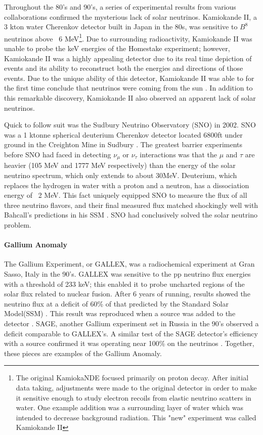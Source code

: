 \documentclass[12pt]{article}
\begin{document}
\par Throughout the 80's and 90's, a series of experimental results from various collaborations confirmed the mysterious lack of solar neutrinos. Kamiokande II, a 3 kton water Cherenkov detector built in Japan in the 80s, was sensitive to $B^8$ neutrinos above ~6 MeV\footnote{The original KamiokaNDE focused primarily on proton decay. After initial data taking, adjustments were made to the original detector in order to make it sensitive enough to study electron recoils from elastic neutrino scatters in water. One example addition was a surrounding layer of water which was intended to decrease background radiation.  This "new" experiment was called Kamiokande II}. Due to surrounding radioactivity, Kamiokande II was unable to probe the keV energies of the Homestake experiment; however, Kamiokande II was a highly appealing detector due to its real time depiction of events and its ability to reconstruct both the energies and directions of those events. Due to the unique ability of this detector, Kamiokande II was able to for the first time conclude that neutrinos were coming from the sun \cite{kam0}.  In addition to this remarkable discovery, Kamiokande II also observed an apparent lack of solar neutrinos.
\par Quick to follow suit was the Sudbury Neutrino Observatory (SNO) in 2002.  SNO was a 1 ktonne spherical deuterium Cherenkov detector located 6800ft under ground in the Creighton Mine in Sudbury \cite{sno}. The greatest barrier experiments before SNO had faced in detecting $\nu_\mu$ or $\nu_\tau$ interactions was that the $\mu$ and $\tau$ are heavier (105 MeV and 1777 MeV respectively) than the energy of the solar neutrino spectrum, which only extends to about 30MeV. Deuterium, which replaces the hydrogen in water with a proton and a neutron, has a dissociation energy of ~2 MeV. This fact uniquely equipped SNO to measure the flux of all three neutrino flavors, and their final measured flux matched shockingly well with Bahcall's predictions in his SSM \cite{sno}.  SNO had conclusively solved the solar neutrino problem.  
\paragraph{Gallium Anomaly} The Gallium Experiment, or GALLEX, was a radiochemical experiment at Gran Sasso, Italy in the 90's. GALLEX was sensitive to the pp neutrino flux energies with a threshold of 233 keV; this enabled it to probe uncharted regions of the solar flux related to nuclear fusion. After 6 years of running, results showed the neutrino flux at a deficit of 60\% of that predicted by the Standard Solar Model(SSM) \cite{gal0}. This result was reproduced when a  source was added to the detector \cite{gal2}. SAGE, another Gallium experiment set in Russia in the 90's observed a deficit comparable to GALLEX's.  A similar test of the SAGE detector's efficiency with a  source confirmed it was operating near 100\% on the  neutrinos \cite{sage}.  Together, these pieces are examples of the Gallium Anomaly.  
\end{document}

